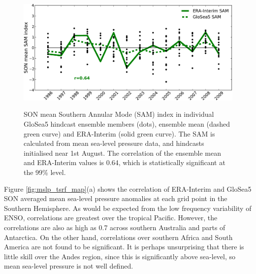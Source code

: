 \begin{figure}[t]
  \noindent\includegraphics[width=\textwidth,angle=0]{figures/chapter-seasonal/sam_crop.pdf}\\
  \caption[GloSea5 predictions of the SAM.]{SON mean Southern Annular Mode (SAM)
index in individual GloSea5 hindcast ensemble members (dots), ensemble mean
(dashed green curve) and ERA-Interim (solid green curve). The SAM is calculated
from mean sea-level pressure data, and hindcasts initialised near 1st
August. The correlation of the ensemble mean and ERA-Interim values is 0.64,
which is statistically significant at the 99\% level.}\label{fig:sam_ts}
\end{figure}

Figure \ref{fig:mslp_tsrf_map}(a) shows the correlation of ERA-Interim and
GloSea5 SON averaged mean sea-level pressure anomalies at each grid point in the
Southern Hemisphere. As would be expected from the low frequency variability of
ENSO, correlations are greatest over the tropical Pacific. However, the
correlations are also as high as 0.7 across southern Australia and parts of
Antarctica.  On the other hand, correlations over southern Africa and South
America are not found to be significant. It is perhaps unsurprising that there
is little skill over the Andes region, since this is significantly above
sea-level, so mean sea-level pressure is not well defined.

